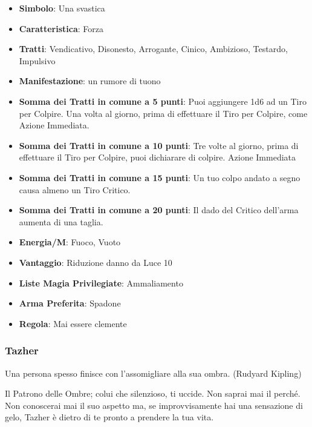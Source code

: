 \begin{multicols}{2}
\begin{itemize}[leftmargin=*] \setlength{\itemsep}{0pt}
\item \textbf{Simbolo}: Una svastica
\item \textbf{Caratteristica}: Forza
\item \textbf{Tratti}: Vendicativo, Disonesto, Arrogante, Cinico, Ambizioso, Testardo, Impulsivo
\item \textbf{Manifestazione}: un rumore di tuono
\item \textbf{Somma dei Tratti in comune a 5 punti}: Puoi aggiungere 1d6 ad un Tiro per Colpire. Una volta al giorno, prima di effettuare il Tiro per Colpire, come Azione Immediata.
\item \textbf{Somma dei Tratti in comune a 10 punti}: Tre volte al giorno, prima di effettuare il Tiro per Colpire, puoi dichiarare di colpire. Azione Immediata
\item \textbf{Somma dei Tratti in comune a 15 punti}: Un tuo colpo andato a segno causa almeno un Tiro Critico.
\item \textbf{Somma dei Tratti in comune a 20 punti}: Il dado del Critico dell'arma aumenta di una taglia.
\item \textbf{Energia/M}: Fuoco, Vuoto
\item \textbf{Vantaggio}: Riduzione danno da Luce 10
\item \textbf{Liste Magia Privilegiate}: Ammaliamento
\item \textbf{Arma Preferita}: Spadone
\item \textbf{Regola}: Mai essere clemente
\end{itemize}

\subsubsection{Tazher}\label{tazher}\hypertarget{tazher}{}

\begin{changemargin}{0.3cm}{0.3cm}\begin{enfasi}{
Una persona spesso finisce con l'assomigliare alla sua ombra. (Rudyard Kipling)
}\end{enfasi}\end{changemargin}

Il Patrono delle Ombre; colui che silenzioso, ti uccide. Non saprai mai il perché. Non conoscerai mai il suo aspetto ma, se improvvisamente hai una sensazione di gelo, Tazher è dietro di te pronto a prendere la tua vita.


\end{multicols}
